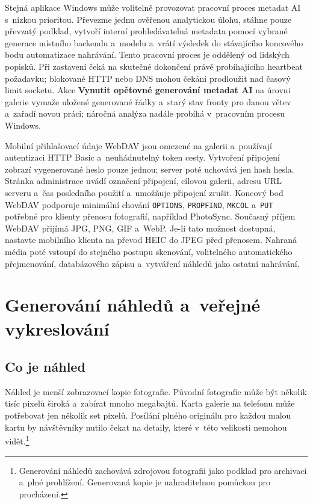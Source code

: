 \documentclass[11pt,a4paper]{article}
\newcommand{\ui}[1]{\textbf{#1}}
\newcommand{\codeword}[1]{\nolinkurl{#1}}
\begin{document}
Stejná aplikace Windows může volitelně provozovat pracovní proces metadat AI
s~nízkou prioritou. Převezme jednu ověřenou analytickou úlohu, stáhne pouze
převzatý podklad, vytvoří interní prohledávatelná metadata pomocí vybrané
generace místního backendu a~modelu a~vrátí výsledek do stávajícího koncového
bodu automatizace nahrávání. Tento pracovní proces je oddělený od lidských
popisků. Při zastavení čeká na skutečné dokončení právě probíhajícího heartbeat
požadavku; blokované HTTP nebo DNS mohou čekání prodloužit nad časový limit socketu.
Akce \ui{Vynutit opětovné generování metadat AI} na úrovni galerie
vymaže uložené generované řádky a~starý stav fronty pro danou větev a~zařadí
novou práci; náročná analýza nadále probíhá v~pracovním procesu Windows.

Mobilní přihlašovací údaje WebDAV jsou omezené na galerii a~používají
autentizaci HTTP Basic a~neuhádnutelný token cesty. Vytvoření připojení zobrazí
vygenerované heslo pouze jednou; server poté uchovává jen hash hesla. Stránka
administrace uvádí označení připojení, cílovou galerii, adresu URL serveru a~čas
posledního použití a~umožňuje připojení zrušit. Koncový bod WebDAV podporuje
minimální chování \codeword{OPTIONS}, \codeword{PROPFIND}, \codeword{MKCOL}
a~\codeword{PUT} potřebné pro klienty přenosu fotografií, například PhotoSync.
Současný příjem WebDAV přijímá JPG, PNG, GIF a~WebP. Je-li tato možnost
dostupná, nastavte mobilního klienta na převod HEIC do JPEG před přenosem.
Nahraná média poté vstoupí do stejného postupu skenování, volitelného
automatického přejmenování, databázového zápisu a~vytváření náhledů jako ostatní
nahrávání.
\section{Generování náhledů a~veřejné vykreslování}
\label{sec:thumbnails}

\subsection{Co je náhled}

Náhled je menší zobrazovací kopie fotografie. Původní fotografie může být
několik tisíc pixelů široká a~zabírat mnoho megabajtů. Karta galerie na telefonu
může potřebovat jen několik set pixelů. Posílání plného originálu pro každou
malou kartu by návštěvníky nutilo čekat na detaily, které v~této velikosti
nemohou vidět.\footnote{Generování náhledů zachovává zdrojovou fotografii jako
podklad pro archivaci a~plné prohlížení. Generovaná kopie je nahraditelnou
pomůckou pro procházení.}
\end{document}
